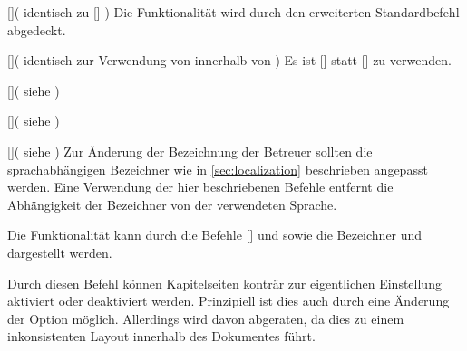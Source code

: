 \begin{Entity'}{}
\begin{Declaration}{[]}(%
  identisch zu []%
)
\printdeclarationlist%
%
Die Funktionalität wird durch den erweiterten Standardbefehl  
abgedeckt.
\end{Declaration}

\begin{Declaration}{[]}(%
  identisch zur Verwendung von  innerhalb von %
)
\printdeclarationlist%
%
Es ist []
statt [] zu verwenden.
\end{Declaration}

\begin{Declaration}{[]}(%
  siehe %
)
\begin{Declaration}{[]}(%
  siehe %
)
\begin{Declaration}{[]}(%
  siehe %
)
\printdeclarationlist%
%
Zur Änderung der Bezeichnung der Betreuer sollten die sprachabhängigen 
Bezeichner wie in \autoref{sec:localization} beschrieben angepasst werden. Eine 
Verwendung der hier beschriebenen Befehle entfernt die Abhängigkeit der 
Bezeichner von der verwendeten Sprache.
\end{Declaration}
\end{Declaration}
\end{Declaration}

\begin{Declaration}{}
\printdeclarationlist%
%
Die Funktionalität kann durch die Befehle [] 
und  sowie die Bezeichner  und 
 dargestellt werden.
\end{Declaration}

\begin{Declaration}{}
\printdeclarationlist%
%
Durch diesen Befehl können Kapitelseiten konträr zur eigentlichen Einstellung 
aktiviert oder deaktiviert werden. Prinzipiell ist dies auch durch eine 
Änderung der Option  möglich. Allerdings wird davon 
abgeraten, da dies zu einem inkonsistenten Layout innerhalb des Dokumentes 
führt.
\end{Declaration}


\end{Entity'}
